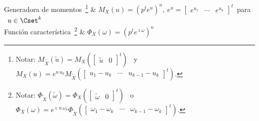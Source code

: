 \begin{caracteristicas}
\hline
%
Generadora de momentos~\footnote{Notar: $M_{\widetilde{X}}\left( \widetilde{u}
\right) = M_X\left( \begin{bmatrix} \widetilde{u} & 0 \end{bmatrix}^t \right)$ \
y \ $M_X(u) = e^{n \, u_k} M_{\widetilde{X}}\left( \begin{bmatrix} u_1 - u_k &
\cdots & u_{k-1} - u_k \end{bmatrix}^t
\right)$.\label{Foot:MP:MultinomialGeneMomentos}} & \protect$\displaystyle
M_X(u) = \left( p^t e^u \right)^n, \: e^u = \begin{bmatrix} e^{u_1} & \cdots &
e^{u_k} \end{bmatrix}^t$\protect \ para \ $u \in \Cset^k$\\[2mm]
\hline
%
Funci\'on caracter\'istica~\footnote{Notar: $\Phi_{\widetilde{X}}\left(
\widetilde{\omega} \right) = \Phi_X\left( \begin{bmatrix} \widetilde{\omega} &
0 \end{bmatrix}^t \right)$ \ o \ $\Phi_X(\omega) = e^{\imath \, n \, \omega_k}
\Phi_{\widetilde{X}}\left( \begin{bmatrix} \omega_1 - \omega_k & \cdots &
\omega_{k-1} - \omega_k \end{bmatrix}^t
\right)$.\label{Foot:MP:MultinomialCaracteristica}} & $\displaystyle
\Phi_X(\omega) = \left( p^t e^{\imath \omega} \right)^n$
\end{caracteristicas}


